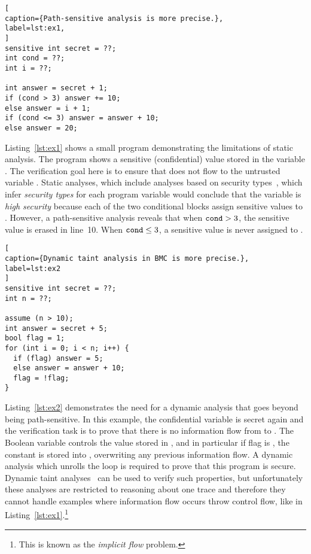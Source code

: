
\noindent\begin{minipage}{\linewidth}
\begin{lstlisting}[
caption={Path-sensitive analysis is more precise.},
label=lst:ex1,
]
sensitive int secret = ??;
int cond = ??;
int i = ??;
	
int answer = secret + 1;
if (cond > 3) answer += 10;
else answer = i + 1;
if (cond <= 3) answer = answer + 10;
else answer = 20; 
\end{lstlisting}
\end{minipage}

Listing~\ref{lst:ex1} shows a small program demonstrating the limitations of static analysis. The program shows a sensitive (confidential) value stored in the variable . The verification goal here is to ensure that  does not flow to the untrusted variable . Static analyses, which include analyses based on security types~\cite{TerauchiSas05,MyersPopl99,SabelfeldComm03}, which infer \emph{security types} for each program variable would conclude that the variable  is \emph{high security} because each of the two conditional blocks assign sensitive values to . However, a path-sensitive analysis reveals that when $\mathtt{cond} > 3$, the sensitive value is erased in line~10. When $\mathtt{cond} \leq 3$, a sensitive value is never assigned to .

\begin{lstlisting}[
caption={Dynamic taint analysis in BMC is more precise.},
label=lst:ex2
]
sensitive int secret = ??;
int n = ??;

assume (n > 10);
int answer = secret + 5;
bool flag = 1;
for (int i = 0; i < n; i++) {
  if (flag) answer = 5;
  else answer = answer + 10;
  flag = !flag;
}
\end{lstlisting}

Listing~\ref{lst:ex2} demonstrates the need for a dynamic analysis that goes beyond being path-sensitive. In this example, the confidential  variable  is secret again and the verification task is to prove that there is no information flow from  to . The Boolean variable  controls the value stored in , and in particular if flag is , the constant  is stored into , overwriting any previous information flow. A dynamic analysis which unrolls the loop is required to prove that this program is secure. Dynamic taint analyses~\cite{KangNdss11,SongIss08,CrandallMicro04,SchwartzSp10} can be used to verify such properties, but unfortunately these analyses are restricted to reasoning about one trace and therefore they cannot handle examples where information flow occurs throw control flow, like in Listing~\ref{lst:ex1}.\footnote{This is known as the \emph{implicit flow} problem.}

